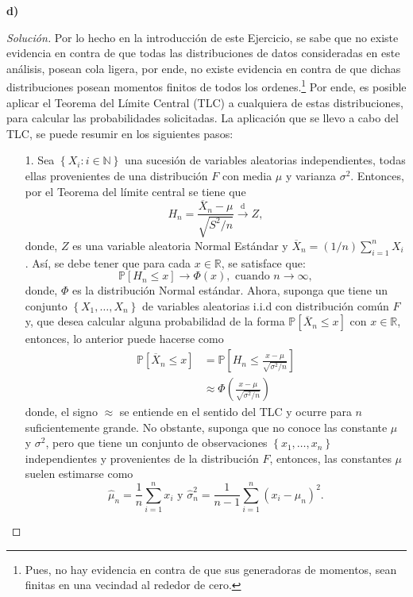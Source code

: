 \documentclass[10.5pt,notitlepage]{article}
\newenvironment{solucion}
  {\begin{proof}[Solución]}
  {\end{proof}}
\newcommand{\PP}{\mathbb{P}}
\newcommand{\RR}{\mathbb{R}}
\newcommand{\NN}{\mathbb{N}}
\newcommand{\todis}{\overset{\mathrm{d}}{\to}}
\newcommand{\corch}[1]{\left[ #1 \right]}
\newcommand{\kis}[1]{\left\{ #1 \right\}}
\newcommand{\pare}[1]{\left( #1 \right)}
\theoremstyle{plain}
\begin{document}
\newpage 
\textbf{d)}
\begin{solucion}
Por lo hecho en la introducción de este Ejercicio, se sabe que no existe evidencia en contra de que todas las distribuciones de datos consideradas en este análisis, posean cola ligera, por ende, no existe evidencia en contra de que dichas distribuciones posean momentos finitos de todos los ordenes.\footnote{Pues, no hay evidencia en contra de que sus generadoras de momentos, sean finitas en una vecindad al rededor de cero.} Por ende, es posible aplicar el Teorema del Límite Central (TLC) a cualquiera de estas distribuciones, para calcular las probabilidades solicitadas. La aplicación que se llevo a cabo del TLC, se puede resumir en los siguientes pasos: 
\begin{itemize}
    \item[1.]
    Sea \(\kis{X_i: i \in \NN}\) una sucesión de variables aleatorias independientes, todas ellas provenientes de una distribución \(F\) con media \(\mu\) y varianza \(\sigma^2\). Entonces, por el Teorema del límite central se tiene que 
    \[
    H_n = \frac{\overline{X}_{n} - \mu}{\sqrt{S^2 / n}} \todis Z, 
    \]
    donde, \(Z\) es una variable aleatoria Normal Estándar y \(\overline{X}_{n}  = (1/n)\sum_{i = 1}^{n}X_i\). Así, se debe tener que para cada \(x \in \RR\), se satisface que:
    \[
    \PP[H_{n} \leq x] \to \Phi(x), \text{ cuando } n \to \infty,
    \]
    donde, \(\Phi\) es la distribución Normal estándar. Ahora, suponga que tiene un conjunto \(\kis{X_1, \hdots, X_n}\) de variables aleatorias i.i.d con distribución común \(F\) y, que desea calcular alguna probabilidad de la forma \(\PP[\overline{X}_{n} \leq x]\) con \(x \in \RR\), entonces, lo anterior puede hacerse como 
    \begin{align*}
        \PP\corch{\overline{X}_{n} \leq x} &= \PP\corch{H_{n} \leq \frac{x - \mu}{\sqrt{\sigma^2/n}}}\\  
                                           &\approx \Phi\pare{\frac{x - \mu}{\sqrt{\sigma^2/n}}}  
    \end{align*}
    donde, el signo \(\approx\) se entiende en el sentido del TLC y ocurre para \(n\) suficientemente grande. No obstante, suponga que no conoce las constante \(\mu\) y \(\sigma^2\), pero que tiene un conjunto de observaciones \(\kis{x_1, \hdots, x_{n}}\) independientes y provenientes de la distribución \(F\), entonces, las constantes \(\mu\) suelen estimarse como 
    \begin{equation*}
        \hat{\mu}_{n} = \frac{1}{n}\sum_{i = 1}^{n}x_{i} \text{ y } \hat{\sigma}_{n}^{2} = \frac{1}{n-1}\sum_{i = 1}^{n}(x_{i} - \hat{\mu}_{n})^2. 

\end{equation*}
\end{itemize}
\end{solucion}
\end{document}
